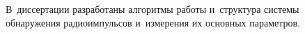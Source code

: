 
В~диссертации разработаны алгоритмы работы и~структура системы обнаружения радиоимпульсов и~измерения их основных параметров. 
